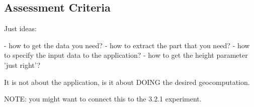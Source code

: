 \subsection{Assessment Criteria}

\begin{note}
Just ideas:

  - how to get the data you need? 
  - how to extract the part that you need?
  - how to specify the input data to the application? 
  - how to get the height parameter 'just right'? 
  
It is not about the application, is it about DOING the desired geocomputation.  

NOTE: you might want to connect this to the 3.2.1 experiment.

\end{note}
  


